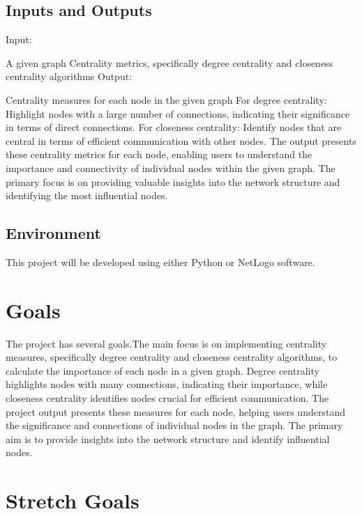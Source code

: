 \documentclass{article}
\begin{document}
\subsection{Inputs and Outputs}

Input:

A given graph
Centrality metrics, specifically degree centrality and closeness centrality algorithms
Output:

Centrality measures for each node in the given graph
For degree centrality: Highlight nodes with a large number of connections, indicating their significance in terms of direct connections.
For closeness centrality: Identify nodes that are central in terms of efficient communication with other nodes.
The output presents these centrality metrics for each node, enabling users to understand the importance and connectivity of individual nodes within the given graph. The primary focus is on providing valuable insights into the network structure and identifying the most influential nodes. 


\subsection{Environment}

This project will be developed using either Python or NetLogo software.


\section{Goals}

The project has several goals.The main focus is on implementing centrality measures, specifically degree centrality and closeness centrality algorithms, to calculate the importance of each node in a given graph. Degree centrality highlights nodes with many connections, indicating their importance, while closeness centrality identifies nodes crucial for efficient communication. The project output presents these measures for each node, helping users understand the significance and connections of individual nodes in the graph. The primary aim is to provide insights into the network structure and identify influential nodes.

\section{Stretch Goals}
\end{document}
